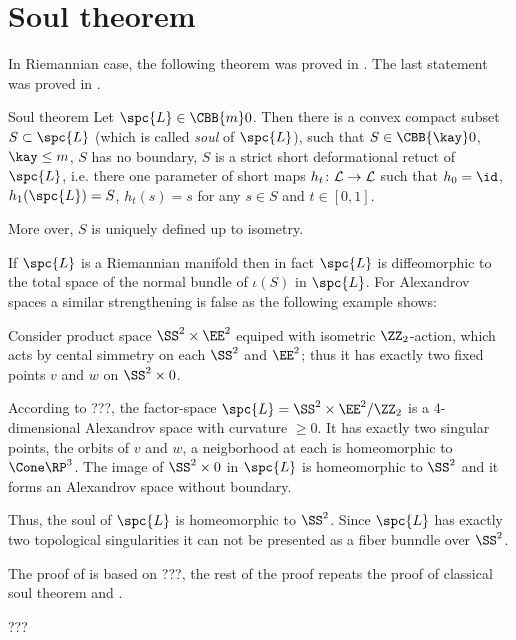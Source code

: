 \section{Soul theorem}

In Riemannian case, the following theorem was proved in \cite{cheeger-gromoll-soul}.
The last statement was proved in \cite{sharafutdinov}.

\begin{thm}{Soul theorem}
Let $\spc{L}\in\CBB{m}0$. 
Then there is a convex compact subset $S\subset \spc{L}$ (which is called \emph{soul} of $\spc{L}$), such that  $S\in\CBB{\kay}0$, $\kay\le m$,
$S$ has no boundary,
$S$ is a strict short deformational retuct of $\spc{L}$, i.e. there one parameter of short maps $h_t\:\spc{L}\to \spc{L}$ such that $h_0=\id$, $h_1(\spc{L})=S$, $h_t(s)=s$ for any $s\in S$ and $t\in[0,1]$.

More over, $S$ is uniquely defined up to isometry.
\end{thm}

If $\spc{L}$ is a Riemannian manifold then in fact
$\spc{L}$ is diffeomorphic to the total space of the normal bundle of $\iota(S)$ in $\spc{L}$. 
For Alexandrov spaces a similar strengthening is false as the following example shows:

 Consider product space $\SS^2\times \EE^2$ equiped with isometric $\ZZ_2$-action, which acts by cental simmetry on each $\SS^2$ and $\EE^2$; thus it has exactly two fixed points $v$ and $w$ on $\SS^2\times 0$.

According to ???,
the factor-space $\spc{L}=\SS^2\times \EE^2/\ZZ_2$ is a $4$-dimensional Alexandrov space with curvature $\ge 0$.
It has exactly two singular points, the orbits of $v$ and $w$, a neigborhood at each is homeomorphic to $\Cone\RP^3$.
The image of $\SS^2\times 0$ in $\spc{L}$ is homeomorphic to $\SS^2$ and it forms an Alexandrov space without boundary.

Thus, the soul of $\spc{L}$ is homeomorphic to $\SS^2$. 
Since $\spc{L}$ has exactly two topological singularities it can not be presented as a fiber bunndle over $\SS^2$. 

\smallskip

The proof of is based on ???,
the rest of the proof repeats the proof of classical soul theorem \cite{cheeger-gromoll-soul} and \cite{sharafutdinov}.

???
\qeds







